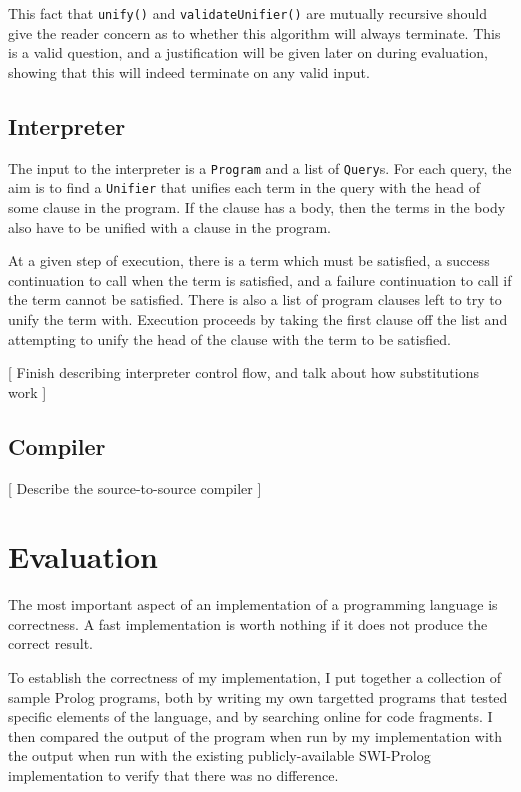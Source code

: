 \documentclass[12pt]{article}
\begin{document}
This fact that \verb|unify()| and \verb|validateUnifier()| are mutually recursive should give the reader concern as to whether this algorithm will always terminate. 
This is a valid question, and a justification will be given later on during evaluation, showing that this will indeed terminate on any valid input.

\subsection{Interpreter}

The input to the interpreter is a \verb|Program| and a list of \verb|Query|s. 
For each query, the aim is to find a \verb|Unifier| that unifies each term in the query with the head of some clause in the program. 
If the clause has a body, then the terms in the body also have to be unified with a clause in the program.

At a given step of execution, there is a term which must be satisfied, a success continuation to call when the term is satisfied, and a failure continuation to call if the term cannot be satisfied. There is also a list of program clauses left to try to unify the term with. 
Execution proceeds by taking the first clause off the list and attempting to unify the head of the clause with the term to be satisfied. 

[ Finish describing interpreter control flow, and talk about how substitutions work ]

\subsection{Compiler}

[ Describe the source-to-source compiler ]

\newpage

\section{Evaluation}


The most important aspect of an implementation of a programming language is correctness. 
A fast implementation is worth nothing if it does not produce the correct result.

To establish the correctness of my implementation, I put together a collection of sample Prolog programs, both by writing my own targetted programs that tested specific elements of the language, and by searching online for code fragments. 
I then compared the output of the program when run by my implementation with the output when run with the existing publicly-available SWI-Prolog implementation to verify that there was no difference.
\end{document}
